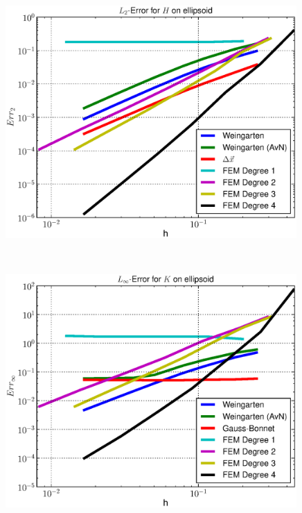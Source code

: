 \begin{figure}
\begin{minipage}[htp]{.23\textwidth}
    \end{minipage}\hfill
    \begin{minipage}[htp]{.23\textwidth}
      \centering
      \includegraphics[width=0.99\textwidth]{bilder/ellipsoid/L2H.eps}
    \end{minipage}\\
    \begin{minipage}[htp]{.23\textwidth}
      \centering
      \includegraphics[width=0.99\textwidth]{bilder/ellipsoid/LMaxK.eps}
    \end{minipage}\hfill
    \begin{minipage}[htp]{.23\textwidth}

\end{minipage}
\end{figure}
